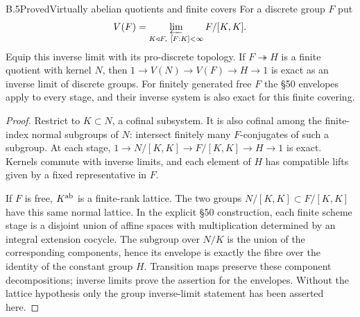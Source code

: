 \begin{statement}{B.5}{Proved}{Virtually abelian quotients and finite covers}
For a discrete group $F$ put
\[
 V(F)=\varprojlim_{K\triangleleft F,\ [F:K]<\infty}F/[K,K].
\]
Equip this inverse limit with its pro-discrete topology.
If $F\twoheadrightarrow H$ is a finite quotient with kernel $N$,
then $1\to V(N)\to V(F)\to H\to1$ is exact as an inverse limit
of discrete groups. For finitely generated free $F$ the \S50 envelopes apply to
every stage, and their inverse system is also exact for this
finite covering.
\end{statement}
\begin{proof}
Restrict to $K\subset N$, a cofinal subsystem. It is also cofinal
among the finite-index normal subgroups of $N$: intersect finitely
many $F$-conjugates of such a subgroup. At each stage,
$1\to N/[K,K]\to F/[K,K]\to H\to1$ is exact. Kernels commute
with inverse limits, and each element of $H$ has compatible lifts
given by a fixed representative in $F$.

If $F$ is free, $K^{\mathrm{ab}}$ is a finite-rank lattice. The two groups
$N/[K,K]\subset F/[K,K]$ have this same normal lattice.
In the explicit \S50 construction, each finite scheme stage is
a disjoint union of affine spaces with multiplication determined
by an integral extension cocycle. The subgroup over $N/K$ is
the union of the corresponding components, hence its envelope
is exactly the fibre over the identity of the constant group
$H$. Transition maps preserve these component decompositions;
inverse limits prove the assertion for the envelopes. Without
the lattice hypothesis only the group inverse-limit statement
has been asserted here.
\end{proof}

